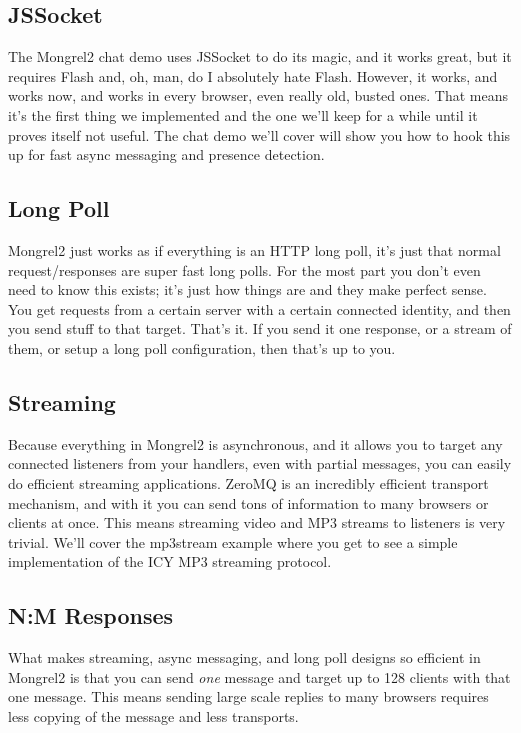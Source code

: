 \subsection{JSSocket}

The Mongrel2 chat demo uses JSSocket to do its magic, and it works great, but it requires
Flash and, oh, man, do I absolutely hate Flash.  However, it works, and works now, and works in every
browser, even really old, busted ones.  That means it's the first thing we implemented and
the one we'll keep for a while until it proves itself not useful.  The chat demo we'll
cover will show you how to hook this up for fast async messaging and presence detection.


\subsection{Long Poll}

Mongrel2 just works as if everything is an HTTP long poll, it's just that normal request/responses
are super fast long polls.  For the most part you don't even need to know this exists; it's just
how things are and they make perfect sense.  You get requests from a certain server with a
certain connected identity, and then you send stuff to that target.  That's it.  If you send it
one response, or a stream of them, or setup a long poll configuration, then that's up to you.


\subsection{Streaming}

Because everything in Mongrel2 is asynchronous, and it allows you to target any connected listeners
from your handlers, even with partial messages, you can easily do efficient streaming applications.  ZeroMQ
is an incredibly efficient transport mechanism, and with it you can send tons of information to many
browsers or clients at once.  This means streaming video and MP3 streams to listeners is very
trivial.  We'll cover the mp3stream example where you get to see a simple implementation of the ICY
MP3 streaming protocol.

\subsection{N:M Responses}

What makes streaming, async messaging, and long poll designs so efficient in Mongrel2 is that you can send
\emph{one} message and target up to 128 clients with that one message.  This means sending large scale replies
to many browsers requires less copying of the message and less transports.

